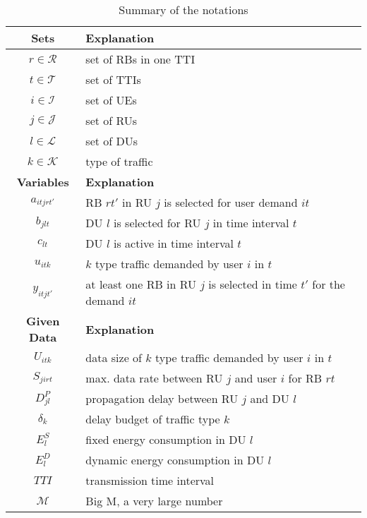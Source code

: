 \documentclass[conference]{IEEEtran}
\begin{document}
\begin{table}
\centering
\caption{\label{tab:Notations} Summary of the notations}
\begin{tabular}{c|p{6cm}}
\textbf{Sets} & \textbf{Explanation} \\ \hline
$r\in\mathcal{R}$ & set of RBs in one TTI\\
$t\in\mathcal{T}$ & set of TTIs \\
$i\in\mathcal{I}$ & set of UEs \\
$j\in\mathcal{J}$ & set of RUs \\
$l\in\mathcal{L}$ & set of DUs \\
$k\in\mathcal{K}$ & type of traffic \\ \hline
\textbf{Variables}& \textbf{Explanation} \\ \hline
$a_{itjrt'}$ & RB $rt'$ in RU $j$ is selected for user demand $it$ \\
$b_{jlt}$ & DU $l$ is selected for RU $j$ in time interval $t$  \\
$c_{lt}$ & DU $l$ is active in time interval $t$ \\
$u_{itk}$ & $k$ type traffic demanded by user $i$ in $t$ \\
$y_{itjt'}$ & at least one RB in RU $j$ is selected in time $t'$ for the demand $it$ \\ \hline
\textbf{Given Data}& \textbf{Explanation} \\ \hline
$U_{itk}$ & data size of $k$ type traffic demanded by user $i$ in $t$ \\
$S_{jirt}$ & max. data rate between RU $j$ and user $i$ for RB $rt$ \\
$D_{jl}^P$ & propagation delay between RU $j$ and DU $l$ \\
$\delta_{k}$ & delay budget of traffic type $k$ \\
$E_{l}^S$ & fixed energy consumption in DU $l$ \\
$E_{l}^D$ & dynamic energy consumption in DU $l$ \\
$TTI$ & transmission time interval  \\
$\mathcal{M}$ & Big M, a very large number  \\
\hline
\end{tabular}
\end{table}
\end{document}
